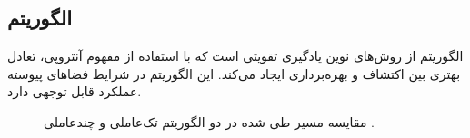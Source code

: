 
\subsection{الگوریتم }

الگوریتم   از روش‌های نوین یادگیری تقویتی است که با استفاده از مفهوم آنتروپی، تعادل بهتری بین اکتشاف و بهره‌برداری ایجاد می‌کند. این الگوریتم در شرایط فضاهای پیوسته عملکرد قابل توجهی دارد.

\begin{figure}[H]
	\centering
	
	
	\caption{
		مقایسه مسیر طی شده در دو الگوریتم تک‌عاملی و چندعاملی .
	}
\end{figure}


